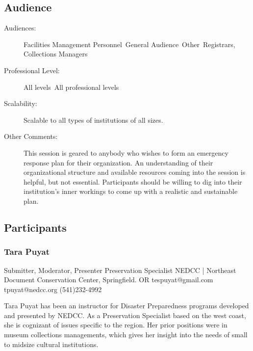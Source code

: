 \documentclass{report}
\begin{document}
              \subsection*{Audience}
                \begin{description}
                  \item [Audiences:]Facilities Management Personnel~General Audience~Other~Registrars, Collections Managers~
                  \item[Professional Level:]All levels~All professional levels~
                \item[Scalability:] Scalable to all types of institutions of all sizes.

							
              \item[Other Comments:] This session is geared to anybody who wishes to form an emergency response plan for their organization. An understanding of their organizational structure and available resources coming into the session is helpful, but not essential. Participants should be willing to dig into their institution’s inner workings to come up with a realistic and sustainable plan.
              \end{description}
            \subsection*{Participants}
              \subsubsection*{ Tara Puyat }
              Submitter, Moderator, Presenter\newline
              Preservation Specialist\newline
              NEDCC | Northeast Document Conservation Center, Springfield. OR
              \newline
              tespuyat@gmail.com\newline
              tpuyat@nedcc.org\newline
              (541)232-4992\newline

              Tara Puyat has been an instructor for Disaster Preparedness programs developed and presented by NEDCC. As a Preservation Specialist based on the west coast, she is cognizant of issues specific to the region. Her prior positions were in museum collections managements, which gives her insight into the needs of small to midsize cultural institutions.\newline
\end{document}
